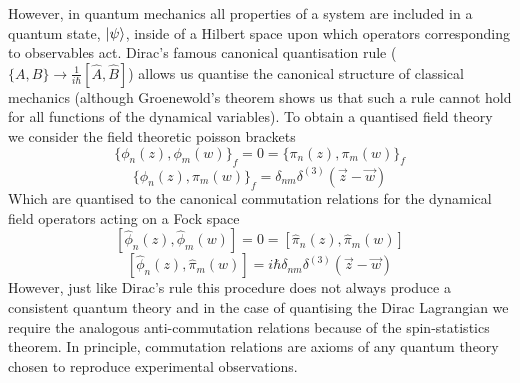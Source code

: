 \documentclass[11pt, a4paper]{article}
\theoremstyle{definition}
\theoremstyle{plain}
\begin{document}
However, in quantum mechanics all properties of a system are included in a quantum state, $\ket{\psi}$, 
inside of a Hilbert space upon which operators corresponding to observables act.
Dirac's famous canonical quantisation
rule (${\{A, B \} \rightarrow \frac{1}{i\hbar}[\hat{A}, \hat{B}]}$) allows us quantise 
the canonical structure of classical mechanics (although Groenewold's theorem shows us 
that such a rule cannot hold for all functions of the dynamical variables). 
To obtain a quantised field theory we consider the field theoretic poisson brackets
\begin{equation}
  {\{ \phi_n(z), \phi_m(w) \}}_f = 0 = {\{ \pi_n(z), \pi_m(w) \}}_f
\end{equation}
\begin{equation}
  {\{\phi_n(z), \pi_m(w) \}}_f = \delta_{nm}\delta^{(3)}(\vec{z} - \vec{w})
\end{equation}
Which are quantised to the canonical commutation relations for the dynamical
field operators acting on a Fock space
\begin{equation}
  {[\hat{\phi}_n(z), \hat{\phi}_m(w) ]} = 0
  = {[\hat{\pi}_n(z), \hat{\pi}_m(w) ]}
\end{equation}
\begin{equation}
  {[ \hat{\phi}_n(z), \hat{\pi}_m(w) ]}
  = i\hbar\delta_{nm}\delta^{(3)}(\vec{z} - \vec{w})
\end{equation}
However, just like Dirac's rule this procedure does not always produce a consistent quantum
theory and in the case of quantising the Dirac Lagrangian we require the analogous anti-commutation
relations because of the spin-statistics theorem.
In principle, commutation relations are axioms of any quantum theory
chosen to reproduce experimental observations.
\end{document}

